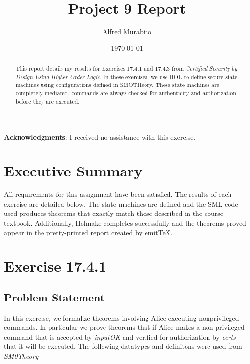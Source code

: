 \documentclass{article}
\title{Project 9 Report}
\author{Alfred Murabito}
\date{\today}
\begin{document}
\maketitle{}

\newpage

\begin{abstract}
This report details my results for Exercises 17.4.1 and 17.4.3 from
\textit{Certified Security by Design Using Higher Order Logic}. 
In these exercises, we use HOL to define secure state machines using configurations
defined in SMOTHeory. These state machines are completely mediated, commands are always 
checked for authenticity and authorization before they are executed.

\end{abstract}

\newpage

\textbf{Acknowledgments}: I received no assistance with this exercise.

\newpage

\tableofcontents

\newpage

\section{Executive Summary}
\label{sec:executive-summary}

All requirements for this assignment have been satisfied. The 
results of each exercise are detailed below. The state machines
are defined and the SML code used produces theorems that 
exactly match those described in the course textbook.
Additionally, Holmake completes successfully and the theorems 
proved appear in the pretty-printed report created by emitTeX.
\newpage

\section{Exercise 17.4.1}
\label{sec:exercise-17.4.1}

\subsection{Problem Statement}
\label{sec:problem-statement}

In this exercise, we formalize theorems involving Alice executing
nonprivileged commands. In particular we prove theorems that if Alice makes
a non-privileged command that is accepted by \textit{inputOK} and verified
for authorization by \textit{certs} that it will be executed. The following 
datatypes and definitons were used from \textit{SM0Theory}
\end{document}
